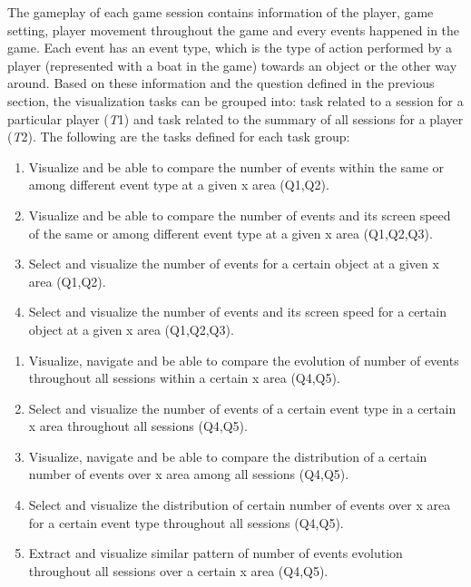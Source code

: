 \documentclass{vgtc}                          %
\begin{document}
The gameplay of each game session contains information of the player, game setting, player movement throughout the game and every events happened in the game. Each event has an event type, which is the type of action performed by a player (represented with a boat in the game) towards an object or the other way around. Based on these information and the question defined in the previous section, the visualization tasks can be grouped into: task related to a session for a particular player (\textit{T}1) and task related to the summary of all sessions for a player (\textit{T}2). The following are the tasks defined for each task group:
\newcommand{\task}[2]{$#1 #2$}
\begin{enumerate}[label=\textbf{(\task{T1.}{\arabic*})}]
\item \label{t11} Visualize and be able to compare the number of events within the same or among different event type at a given x area (Q1,Q2).
\item \label{t12} Visualize and be able to compare the number of events and its screen speed of the same or among different event type at a given x area (Q1,Q2,Q3).
\item \label{t13} Select and visualize the number of events for a certain object at a given x area (Q1,Q2).
\item \label{t14} Select and visualize the number of events and its screen speed for a certain object at a given x area (Q1,Q2,Q3).
\end{enumerate}

\newcommand{\test}[2]{$#1 #2$}
\begin{enumerate}[label=\textbf{(\test{T2.}{\arabic*})}]
\item \label{t21} Visualize, navigate and be able to compare the evolution of number of events throughout all sessions within a certain x area (Q4,Q5).
\item \label{t22} Select and visualize the number of events of a certain event type in a certain x area throughout all sessions (Q4,Q5).
\item \label{t23} Visualize, navigate and be able to compare the distribution of a certain number of events over x area among all sessions (Q4,Q5).
\item \label{t24} Select and visualize the distribution of certain number of events over x area for a certain event type throughout all sessions (Q4,Q5).
\item \label{t25} Extract and visualize similar pattern of number of events evolution throughout all sessions over a certain x area (Q4,Q5).
\end{enumerate}
\end{document}
